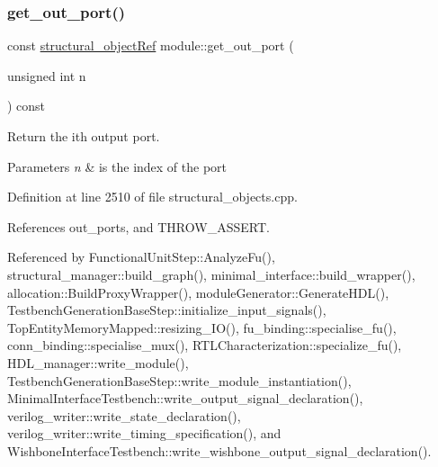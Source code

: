 \mbox{\label{classmodule_a65622911a335dc1ddc695d49606dfc8e}} 
\subsubsection{\texorpdfstring{get\+\_\+out\+\_\+port()}{get\_out\_port()}}
{\footnotesize\ttfamily const \hyperlink{structural__objects_8hpp_a8ea5f8cc50ab8f4c31e2751074ff60b2}{structural\+\_\+object\+Ref} module\+::get\+\_\+out\+\_\+port (\begin{DoxyParamCaption}\item[{unsigned int}]{n }\end{DoxyParamCaption}) const}



Return the ith output port. 


\begin{DoxyParams}{Parameters}
{\em n} & is the index of the port \\
\hline
\end{DoxyParams}


Definition at line 2510 of file structural\+\_\+objects.\+cpp.



References out\+\_\+ports, and T\+H\+R\+O\+W\+\_\+\+A\+S\+S\+E\+RT.



Referenced by Functional\+Unit\+Step\+::\+Analyze\+Fu(), structural\+\_\+manager\+::build\+\_\+graph(), minimal\+\_\+interface\+::build\+\_\+wrapper(), allocation\+::\+Build\+Proxy\+Wrapper(), module\+Generator\+::\+Generate\+H\+D\+L(), Testbench\+Generation\+Base\+Step\+::initialize\+\_\+input\+\_\+signals(), Top\+Entity\+Memory\+Mapped\+::resizing\+\_\+\+I\+O(), fu\+\_\+binding\+::specialise\+\_\+fu(), conn\+\_\+binding\+::specialise\+\_\+mux(), R\+T\+L\+Characterization\+::specialize\+\_\+fu(), H\+D\+L\+\_\+manager\+::write\+\_\+module(), Testbench\+Generation\+Base\+Step\+::write\+\_\+module\+\_\+instantiation(), Minimal\+Interface\+Testbench\+::write\+\_\+output\+\_\+signal\+\_\+declaration(), verilog\+\_\+writer\+::write\+\_\+state\+\_\+declaration(), verilog\+\_\+writer\+::write\+\_\+timing\+\_\+specification(), and Wishbone\+Interface\+Testbench\+::write\+\_\+wishbone\+\_\+output\+\_\+signal\+\_\+declaration().

